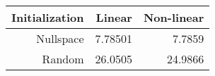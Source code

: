 \begin{tabular}{rrr}
  \hline
  \textbf{Initialization} & \textbf{Linear} & \textbf{Non-linear} \\\hline
  Nullspace & 7.78501 & 7.7859 \\
  Random & 26.0505 & 24.9866 \\\hline
\end{tabular}
